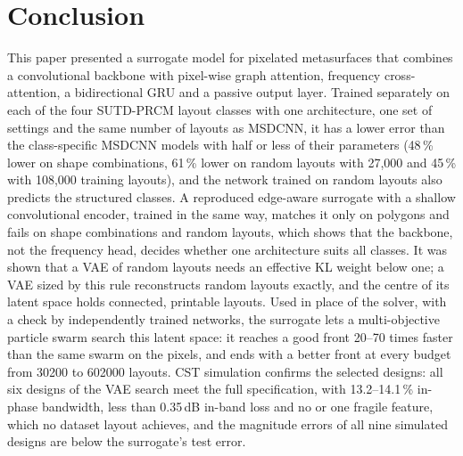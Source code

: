 \section{Conclusion}
This paper presented a surrogate model for pixelated metasurfaces that combines a convolutional backbone with pixel-wise graph attention, frequency cross-attention, a bidirectional GRU and a passive output layer. Trained separately on each of the four SUTD-PRCM layout classes with one architecture, one set of settings and the same number of layouts as MSDCNN, it has a lower error than the class-specific MSDCNN models with half or less of their parameters (48\,\% lower on shape combinations, 61\,\% lower on random layouts with 27,000 and 45\,\% with 108,000 training layouts), and the network trained on random layouts also predicts the structured classes. A reproduced edge-aware surrogate with a shallow convolutional encoder, trained in the same way, matches it only on polygons and fails on shape combinations and random layouts, which shows that the backbone, not the frequency head, decides whether one architecture suits all classes. It was shown that a VAE of random layouts needs an effective KL weight below one; a VAE sized by this rule reconstructs random layouts exactly, and the centre of its latent space holds connected, printable layouts. Used in place of the solver, with a check by independently trained networks, the surrogate lets a multi-objective particle swarm search this latent space: it reaches a good front 20--70 times faster than the same swarm on the pixels, and ends with a better front at every budget from \num{30200} to \num{602000} layouts. CST simulation confirms the selected designs: all six designs of the VAE search meet the full specification, with 13.2--14.1\,\% in-phase bandwidth, less than 0.35\,dB in-band loss and no or one fragile feature, which no dataset layout achieves, and the magnitude errors of all nine simulated designs are below the surrogate's test error.

